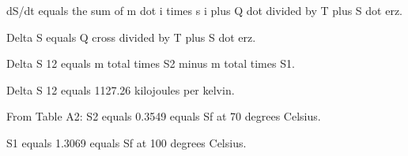 dS/dt equals the sum of m dot i times s i plus Q dot divided by T plus S dot erz.  

Delta S equals Q cross divided by T plus S dot erz.  

Delta S 12 equals m total times S2 minus m total times S1.  

Delta S 12 equals 1127.26 kilojoules per kelvin.  

From Table A2:  
S2 equals 0.3549 equals Sf at 70 degrees Celsius.  

S1 equals 1.3069 equals Sf at 100 degrees Celsius.